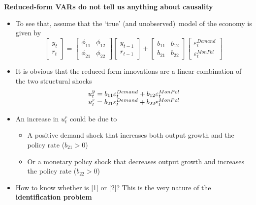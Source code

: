 
\begin{frame}
{\textbf{Reduced-form VARs do not tell us anything about causality}}

\begin{itemize}
\item To see that, assume that the `true' (and unobserved)\ model of the
economy is given by%
\begin{equation*}
\begin{bmatrix}
y_{t} \\ 
r_{t}%
\end{bmatrix}%
=\left[ 
\begin{array}{cc}
\phi _{11} & \phi _{12} \\ 
\phi _{21} & \phi _{22}%
\end{array}%
\right] 
\begin{bmatrix}
y_{t-1} \\ 
r_{t-1}%
\end{bmatrix}%
+\left[ 
\begin{array}{cc}
b_{11} & b_{12} \\ 
b_{21} & b_{22}%
\end{array}%
\right] 
\begin{bmatrix}
\varepsilon _{t}^{Demand} \\ 
\varepsilon _{t}^{MonPol}%
\end{bmatrix}%
\end{equation*}

\item It is obvious that the reduced form innovations are a linear
combination of the two structural shocks%
\begin{equation*}
\begin{array}{c}
u_{t}^{y}=b_{11}\varepsilon _{t}^{Demand}+b_{12}\varepsilon _{t}^{MonPol}{%
\mathbf{\medskip }} \\ 
u_{t}^{r}=b_{21}\varepsilon _{t}^{Demand}+b_{22}\varepsilon _{t}^{MonPol}%
\end{array}%
\end{equation*}

\item An increase in $u_{t}^{r}$ could be due to \smallskip

\begin{itemize}
\item[{[1]}] A positive demand shock that increases both output growth and
the policy rate ($b_{21}>0$){\textbf{\medskip }}

\item[{[2]}] Or a monetary policy shock that decreases output growth and
increases the policy rate ($b_{22}>0$)\bigskip
\end{itemize}

\pause

\item How to know whether is {\small \color{title}[1]} or {\small %
\color{title}[2]}? This is the very nature of the {{\color{note} }}\textbf{%
identification problem}
\end{itemize}
\end{frame}

